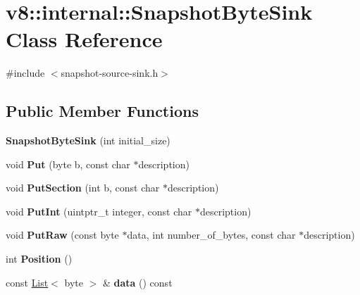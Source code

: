 \hypertarget{classv8_1_1internal_1_1_snapshot_byte_sink}{}\section{v8\+:\+:internal\+:\+:Snapshot\+Byte\+Sink Class Reference}
\label{classv8_1_1internal_1_1_snapshot_byte_sink}


{\ttfamily \#include $<$snapshot-\/source-\/sink.\+h$>$}

\subsection*{Public Member Functions}
\begin{DoxyCompactItemize}
\item 
{\bfseries Snapshot\+Byte\+Sink} (int initial\+\_\+size)\hypertarget{classv8_1_1internal_1_1_snapshot_byte_sink_a44df6d4e0e2bae9808e24e632d4a0c3e}{}\label{classv8_1_1internal_1_1_snapshot_byte_sink_a44df6d4e0e2bae9808e24e632d4a0c3e}

\item 
void {\bfseries Put} (byte b, const char $\ast$description)\hypertarget{classv8_1_1internal_1_1_snapshot_byte_sink_adb1c096459811acb6a84d9cacdcad885}{}\label{classv8_1_1internal_1_1_snapshot_byte_sink_adb1c096459811acb6a84d9cacdcad885}

\item 
void {\bfseries Put\+Section} (int b, const char $\ast$description)\hypertarget{classv8_1_1internal_1_1_snapshot_byte_sink_ad3461ff445a9e50130d967f57affc905}{}\label{classv8_1_1internal_1_1_snapshot_byte_sink_ad3461ff445a9e50130d967f57affc905}

\item 
void {\bfseries Put\+Int} (uintptr\+\_\+t integer, const char $\ast$description)\hypertarget{classv8_1_1internal_1_1_snapshot_byte_sink_a99f6f87ab81c173335c6525eeec718b8}{}\label{classv8_1_1internal_1_1_snapshot_byte_sink_a99f6f87ab81c173335c6525eeec718b8}

\item 
void {\bfseries Put\+Raw} (const byte $\ast$data, int number\+\_\+of\+\_\+bytes, const char $\ast$description)\hypertarget{classv8_1_1internal_1_1_snapshot_byte_sink_ad24beddfd60dd9760ac8895cdb7f7904}{}\label{classv8_1_1internal_1_1_snapshot_byte_sink_ad24beddfd60dd9760ac8895cdb7f7904}

\item 
int {\bfseries Position} ()\hypertarget{classv8_1_1internal_1_1_snapshot_byte_sink_a3f2395c11250e52fcb9d9fa837cad9ac}{}\label{classv8_1_1internal_1_1_snapshot_byte_sink_a3f2395c11250e52fcb9d9fa837cad9ac}

\item 
const \hyperlink{classv8_1_1internal_1_1_list}{List}$<$ byte $>$ \& {\bfseries data} () const \hypertarget{classv8_1_1internal_1_1_snapshot_byte_sink_a35a103ffc832d988c468b74139c92ea8}{}\label{classv8_1_1internal_1_1_snapshot_byte_sink_a35a103ffc832d988c468b74139c92ea8}

\end{DoxyCompactItemize}
